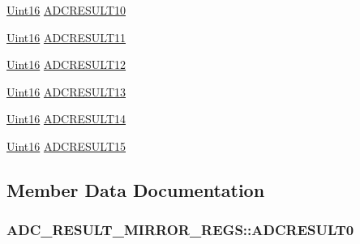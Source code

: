 \begin{DoxyCompactItemize}
\hyperlink{_d_s_p2833x___device_8h_a59a9f6be4562c327cbfb4f7e8e18f08b}{Uint16} \hyperlink{struct_a_d_c___r_e_s_u_l_t___m_i_r_r_o_r___r_e_g_s_a92a7f710bf3d7dd561d54075e33f50f4}{A\+D\+C\+R\+E\+S\+U\+L\+T10}
\item 
\hyperlink{_d_s_p2833x___device_8h_a59a9f6be4562c327cbfb4f7e8e18f08b}{Uint16} \hyperlink{struct_a_d_c___r_e_s_u_l_t___m_i_r_r_o_r___r_e_g_s_a12690e6b43aeaa039f42998caa794989}{A\+D\+C\+R\+E\+S\+U\+L\+T11}
\item 
\hyperlink{_d_s_p2833x___device_8h_a59a9f6be4562c327cbfb4f7e8e18f08b}{Uint16} \hyperlink{struct_a_d_c___r_e_s_u_l_t___m_i_r_r_o_r___r_e_g_s_a10eddf46a62fdde3614d9b703cd778e8}{A\+D\+C\+R\+E\+S\+U\+L\+T12}
\item 
\hyperlink{_d_s_p2833x___device_8h_a59a9f6be4562c327cbfb4f7e8e18f08b}{Uint16} \hyperlink{struct_a_d_c___r_e_s_u_l_t___m_i_r_r_o_r___r_e_g_s_a1ca685149cf127f68df88e10079e342f}{A\+D\+C\+R\+E\+S\+U\+L\+T13}
\item 
\hyperlink{_d_s_p2833x___device_8h_a59a9f6be4562c327cbfb4f7e8e18f08b}{Uint16} \hyperlink{struct_a_d_c___r_e_s_u_l_t___m_i_r_r_o_r___r_e_g_s_a1d1465e4372043d7a21d240b79fc699c}{A\+D\+C\+R\+E\+S\+U\+L\+T14}
\item 
\hyperlink{_d_s_p2833x___device_8h_a59a9f6be4562c327cbfb4f7e8e18f08b}{Uint16} \hyperlink{struct_a_d_c___r_e_s_u_l_t___m_i_r_r_o_r___r_e_g_s_a65ea410a19a894a40a93d9d517056b2c}{A\+D\+C\+R\+E\+S\+U\+L\+T15}
\end{DoxyCompactItemize}


\subsection{Member Data Documentation}
\hypertarget{struct_a_d_c___r_e_s_u_l_t___m_i_r_r_o_r___r_e_g_s_a2bbef27f193fe7d905a980ba86b5a3ed}{}
\subsubsection[{A\+D\+C\+R\+E\+S\+U\+L\+T0}]{ A\+D\+C\+\_\+\+R\+E\+S\+U\+L\+T\+\_\+\+M\+I\+R\+R\+O\+R\+\_\+\+R\+E\+G\+S\+::\+A\+D\+C\+R\+E\+S\+U\+L\+T0}\label{struct_a_d_c___r_e_s_u_l_t___m_i_r_r_o_r___r_e_g_s_a2bbef27f193fe7d905a980ba86b5a3ed}
\hypertarget{struct_a_d_c___r_e_s_u_l_t___m_i_r_r_o_r___r_e_g_s_a7a81a938cc7ae1cb8131cb51d34d9e9a}{}
